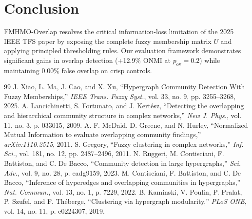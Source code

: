 \documentclass[11pt,a4paper]{article}
\begin{document}
\section{Conclusion}
FMHMO-Overlap resolves the critical information-loss limitation of the 2025 IEEE TFS paper by exposing the complete fuzzy membership matrix $U$ and applying principled thresholding rules. Our evaluation framework demonstrates significant gains in overlap detection (+12.9\% ONMI at $p_{\text{ov}}=0.2$) while maintaining 0.00\% false overlap on crisp controls.

\begin{thebibliography}{99}
 J. Xiao, L. Ma, J. Cao, and X. Xu, ``Hypergraph Community Detection With Fuzzy Memberships,'' \textit{IEEE Trans. Fuzzy Syst.}, vol. 33, no. 9, pp. 3255--3268, 2025.
 A. Lancichinetti, S. Fortunato, and J. Kertész, ``Detecting the overlapping and hierarchical community structure in complex networks,'' \textit{New J. Phys.}, vol. 11, no. 3, p. 033015, 2009.
 A. F. McDaid, D. Greene, and N. Hurley, ``Normalized Mutual Information to evaluate overlapping community findings,'' \textit{arXiv:1110.2515}, 2011.
 S. Gregory, ``Fuzzy clustering in complex networks,'' \textit{Inf. Sci.}, vol. 181, no. 12, pp. 2487--2496, 2011.
 N. Ruggeri, M. Contisciani, F. Battiston, and C. De Bacco, ``Community detection in large hypergraphs,'' \textit{Sci. Adv.}, vol. 9, no. 28, p. eadg9159, 2023.
 M. Contisciani, F. Battiston, and C. De Bacco, ``Inference of hyperedges and overlapping communities in hypergraphs,'' \textit{Nat. Commun.}, vol. 13, no. 1, p. 7229, 2022.
 B. Kaminski, V. Poulin, P. Pralat, P. Szufel, and F. Th\'eberge, ``Clustering via hypergraph modularity,'' \textit{PLoS ONE}, vol. 14, no. 11, p. e0224307, 2019.
\end{thebibliography}
\end{document}
